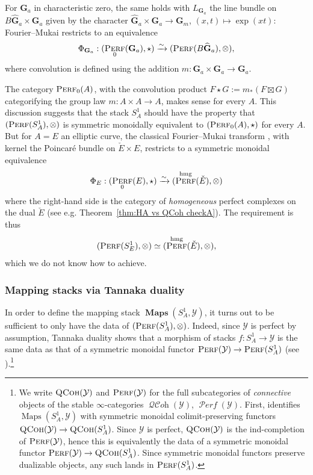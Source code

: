 \documentclass[12pt, oneside]{amsart}
\numberwithin{equation}{section}
\theoremstyle{remark}
\theoremstyle{plain}
\DeclareMathOperator{\QCoh}{\textsc{QCoh}}
\DeclareMathOperator{\QCOH}{\mathcal{QC}\textit{oh}}
\DeclareMathOperator{\Perf}{\textsc{Perf}}
\DeclareMathOperator{\PERF}{\mathcal{P}\textit{erf}}
\DeclareMathOperator{\Map}{Maps}
\DeclareMathOperator{\MAP}{\mathbf{Maps}}
\newcommand{\YY}{\mathcal{Y}}
\newcommand{\GGhat}{\widehat{\mathbf{G}}}
\newcommand{\GGa}{\mathbf{G}_{a}}
\newcommand{\GGm}{\mathbf{G}_{m}}
\begin{document}
For $\GGa$ in characteristic zero, the same holds with $L_{\GGa}$ the line bundle on $B\GGhat_a \times \GGa$ given by the character $\GGhat_a \times \GGa \to \GGm$, $(x,t) \mapsto \exp(xt)$: Fourier--Mukai restricts to an equivalence
\[ \Phi_{\GGa} : (\Perf_0(\GGa), \star) \xrightarrow{\sim} (\Perf(B\GGhat_a), \otimes), \]
where convolution is defined using the addition $m : \GGa \times \GGa \to \GGa$.

The category $\Perf_0(A)$, with the convolution product $F \star G := m_*(F \boxtimes G)$ categorifying the group law $m : A \times A \to A$, makes sense for every $A$.
This discussion suggests that the stack $S^1_A$ should have the property that $(\Perf(S^1_A), \otimes)$ is symmetric monoidally equivalent to $(\Perf_0(A), \star)$ for every $A$.
But for $A = E$ an elliptic curve, the classical Fourier--Mukai transform \cite{Mukai}, with kernel the Poincar\'e bundle on $\check{E} \times E$, restricts to a symmetric monoidal equivalence
\[ \Phi_{E} : (\Perf_0(E), \star) \xrightarrow{\sim} (\Perf^{\mathrm{hmg}}(\check{E}), \otimes) \]
where the right-hand side is the category of \emph{homogeneous} perfect complexes on the dual $\check{E}$ (see e.g. Theorem~\ref{thm:HA vs QCoh checkA}).
The requirement is thus
\[ (\Perf(S^1_E), \otimes) \simeq (\Perf^{\mathrm{hmg}}(\check{E}), \otimes), \]
which we do not know how to achieve.

\subsubsection{Mapping stacks via Tannaka duality}

In order to define the mapping stack $\MAP(S^1_A, \YY)$, it turns out to be sufficient to only have the data of $(\Perf(S^1_A), \otimes)$.
Indeed, since $\YY$ is perfect by assumption, Tannaka duality shows that a morphism of stacks $f : S^1_A \to \YY$ is the same data as that of a symmetric monoidal functor $\Perf(\YY) \to \Perf(S^1_A)$ (see \cite[Thm.~1.3]{BHL}).\footnote{%
  We write $\QCoh(\YY)$ and $\Perf(\YY)$ for the full subcategories of \emph{connective} objects of the stable $\infty$-categories $\QCOH(\YY)$, $\PERF(\YY)$.
  First, \cite[Thm.~1.3]{BHL} identifies $\Map(S^1_A, \YY)$ with symmetric monoidal colimit-preserving functors $\QCoh(\YY) \to \QCoh(S^1_A)$.
  Since $\YY$ is perfect, $\QCoh(\YY)$ is the ind-completion of $\Perf(\YY)$, hence this is equivalently the data of a symmetric monoidal functor $\Perf(\YY) \to \QCoh(S^1_A)$.
  Since symmetric monoidal functors preserve dualizable objects, any such lands in $\Perf(S^1_A)$.
}
\end{document}
